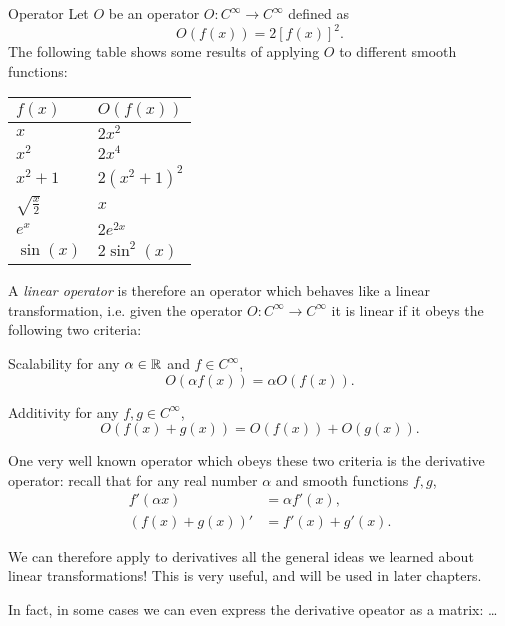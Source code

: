 \begin{example}{Operator}{}
	Let $O$ be an operator $O:C^{\infty}\to C^{\infty}$ defined as
	\[
		O \left( f(x) \right) = 2\left[f(x)\right]^{2}.
	\]
	The following table shows some results of applying $O$ to different smooth functions:
	\begin{center}
		{\renewcommand*{\arraystretch}{1.5}
		\begin{tabular}{ll}
			\toprule
			$f(x)$ & $O \left( f(x) \right)$\\
			\midrule
			$x$ & $2x^{2}$\\
			$x^{2}$ & $2x^{4}$\\
			$x^{2}+1$ & $2 \left( x^{2}+1 \right)^{2}$\\
			$\sqrt{\frac{x}{2}}$ & $x$\\
			$e^{x}$ & $2e^{2x}$\\
			$\sin(x)$ & $2\sin^{2}(x)$\\
			\bottomrule
		\end{tabular}
	}
	\end{center}
\end{example}

A \emph{linear operator} is therefore an operator which behaves like a linear transformation, i.e. given the operator $O:C^{\infty}\to C^{\infty}$ it is linear if it obeys the following two criteria:
\begin{descitemize}
	\item[Scalability] for any $\alpha\in\mathbb{R}^{}$ and $f\in C^{\infty}$,
		\[
			O \left( \alpha f(x) \right) = \alpha O \left( f(x) \right).
		\]
	\item[Additivity] for any $f,g\in C^{\infty}$,
		\[
			O \left( f(x)+g(x) \right) = O \left( f(x) \right) + O \left( g(x) \right).
		\]
\end{descitemize}

One very well known operator which obeys these two criteria is the derivative operator: recall that for any real number $\alpha$ and smooth functions $f,g$,
\begin{align}
	f' \left( \alpha x \right) &= \alpha f'(x)\nonumber,\\
	\left( f(x)+g(x) \right)' &= f'(x) + g'(x).
	\label{eq:derivative_as_linear_opeator}
\end{align}

We can therefore apply to derivatives all the general ideas we learned about linear transformations! This is very useful, and will be used in later chapters.

In fact, in some cases we can even express the derivative opeator as a matrix: \ldots
{}
